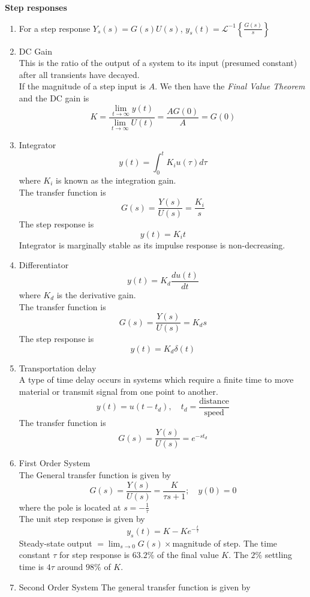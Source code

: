 \documentclass{article}
\begin{document}
\textbf{Step responses}
\begin{enumerate}
    \item For a step response $\displaystyle Y_s(s) = G(s)U(s)$, $\displaystyle y_s(t) = \mathscr{L}^{-1} \left\{ \frac{G(s)}{s} \right\}$
    \item DC Gain \\
    This is the ratio of the output of a system to its input (presumed constant) after all transients have decayed. \\
    If the magnitude of a step input is $A$. We then have the \textit{Final Value Theorem} and the DC gain is
     \[K = \frac{\displaystyle \lim_{ t \to \infty} y(t)}{\displaystyle \lim_{t \to \infty} U(t)} = \frac{AG(0)}{A} = G(0)\]
    \item Integrator 
    \[y(t) = \int_{0}^{t} K_i u(\tau) d\tau\]
    where $K_i$ is known as the integration gain.\\
    The transfer function is 
    \[G(s) = \frac{Y(s)}{U(s)} = \frac{K_i}{s}\]
    The step response is 
    \[y(t) = K_i t\]
    Integrator is marginally stable as its impulse response is non-decreasing. 
    \item Differentiator 
    \[y(t) = K_d \frac{du(t)}{dt}\]
    where $K_d$ is the derivative gain. \\
    The transfer function is 
    \[G(s) = \frac{Y(s)}{U(s)} = K_ds\]
    The step response is 
    \[y(t) = K_d \delta(t)\]
    \item Transportation delay \\
    A type of time delay occurs in systems which require a finite time to move material or transmit signal from one point to another.
    \[y(t) = u(t-t_d), \quad t_d = \frac{\text{distance}}{\text{speed}}\]
    The transfer function is 
    \[G(s) = \frac{Y(s)}{U(s)} = e^{-st_d}\]
    \item First Order System \\
    The General transfer function is given by
    \[G(s) = \frac{Y(s)}{U(s)} = \frac{K}{\tau s+1}; \quad y(0)= 0\]
    where the pole is located at $\displaystyle s =- \frac{1}{\tau}$ \\
    The unit step response is given by
    \[y_s(t) = K - Ke^{-\frac{t}{\tau}}\]
    Steady-state output $= \lim_{s\rightarrow0}G(s) \times $magnitude of step.
    The time constant $\tau$ for step response is $63.2\%$ of the final value $K$. The $2\%$ settling time is $4\tau$ around $98\%$ of $K$.
    \item Second Order System
    The general transfer function is given by

\end{enumerate}
\end{document}
